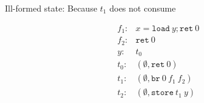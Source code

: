 \documentclass{article}
\newcommand{\Reg}{x}
\newcommand{\Val}{v}
\newcommand{\TName}{t}
\newcommand{\FName}{f}
\newcommand{\LOAD}[2][\Reg]{{#1}=\mathtt{load}\ {#2}}
\newcommand{\STORE}[2][\Val]{\mathtt{store}\ {#1}\ {#2}}
\newcommand{\RET}[1][\Val]{\mathtt{ret}\ {#1}}
\newcommand{\BR}[3][\Val]{\mathtt{br}\ {#1}\ {#2}\ {#3}}
\begin{document}
\newpage

Ill-formed state: Because $\TName_1$ does not consume

$$
\begin{aligned}
\FName_1 : & \LOAD y; \RET [0]\\
\FName_2 : & \RET [0] \\
y : & \TName_0 \\
\TName_0: & (\emptyset, \RET[0]) \\
\TName_1: & (\emptyset,\BR[0] {\FName_1}{\FName_2}) \\
\TName_2: & (\emptyset,\STORE[\TName_1] y)
\end{aligned}
$$
\end{document}
